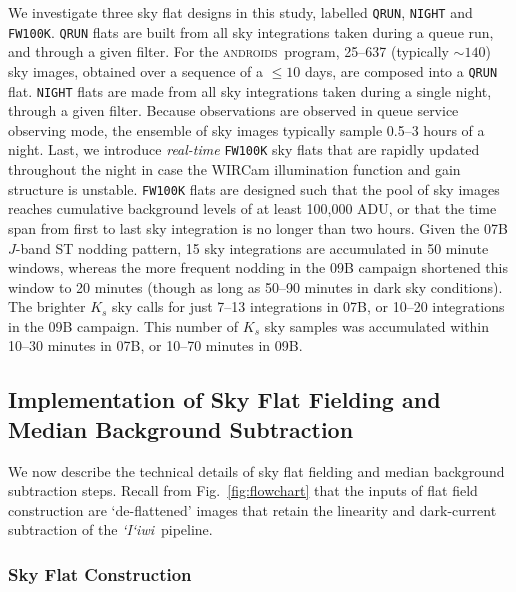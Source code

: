\documentclass[iop,tighten]{emulateapj}
\newcommand{\sw}[1]{\textit{#1}} %
\newcommand{\iiwione}{\sw{`I`iwi}}
\newcommand{\androids}{\textsc{androids}}
\newcommand{\Fig}[1]{Fig.~\ref{fig:#1}}  %
\begin{document}
We investigate three sky flat designs in this study, labelled \texttt{QRUN}, \texttt{NIGHT} and \texttt{FW100K}.
\texttt{QRUN} flats are built from all sky integrations taken during a queue run, and through a given filter.
For the \androids\ program, 25--637 (typically $\sim 140$) sky images, obtained over a sequence of a $\leq 10$ days, are composed into a \texttt{QRUN} flat.
\texttt{NIGHT} flats are made from all sky integrations taken during a single night, through a given filter.
Because observations are observed in queue service observing mode, the ensemble of sky images typically sample 0.5--3 hours of a night.
Last, we introduce \emph{real-time} \texttt{FW100K} sky flats that are rapidly updated throughout the night in case the WIRCam illumination function and gain structure is unstable.
\texttt{FW100K} flats are designed such that the pool of sky images reaches cumulative background levels of at least 100,000 ADU, or that the time span from first to last sky integration is no longer than two hours.
Given the 07B $J$-band ST nodding pattern, 15 sky integrations are accumulated in 50 minute windows, whereas the more frequent nodding in the 09B campaign shortened this window to 20 minutes (though as long as 50--90 minutes in dark sky conditions).
The brighter $K_s$ sky calls for just 7--13 integrations in 07B, or 10--20 integrations in the 09B campaign.
This number of $K_s$ sky samples was accumulated within 10--30 minutes in 07B, or 10--70 minutes in 09B.

\subsection{Implementation of Sky Flat Fielding and Median Background Subtraction}
\label{sec:flatbuilding}

We now describe the technical details of sky flat fielding and median background subtraction steps.
Recall from \Fig{flowchart} that the inputs of flat field construction are `de-flattened' images that retain the linearity and dark-current subtraction of the \iiwione\ pipeline.

\subsubsection{Sky Flat Construction}
\label{sec:skyflatconstruction}
\end{document}
